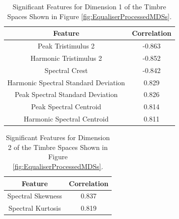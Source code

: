 		\begin{table}[h!]
			\centering
			\begin{tabular}{|c|c|}
				\hline
				\bf{Feature} & \bf{Correlation} \\
				\hline
				\hline
				Peak Tristimulus 2 & -0.863 \\
				\hline
				Harmonic Tristimulus 2 & -0.852 \\
				\hline
				Spectral Crest & -0.842 \\
				\hline
				Harmonic Spectral Standard Deviation &  0.829 \\
				\hline
				Peak Spectral Standard Deviation &  0.826 \\
				\hline
				Peak Spectral Centroid &  0.814 \\
				\hline
				Harmonic Spectral Centroid &  0.811 \\
				\hline
			\end{tabular}
			\caption{Significant Features for Dimension 1 of the Timbre Spaces Shown in Figure 
				 \ref{fig:EqualiserProcessedMDSs}.}
			\label{tab:EqualiserProcessedFeaturesDim1}
		\end{table}

		\begin{table}[h!]
			\centering
			\begin{tabular}{|c|c|}
				\hline
				\bf{Feature} & \bf{Correlation} \\
				\hline
				\hline
				Spectral Skewness & 0.837 \\
				\hline
				Spectral Kurtosis & 0.819 \\
				\hline
			\end{tabular}
			\caption{Significant Features for Dimension 2 of the Timbre Spaces Shown in Figure 
				 \ref{fig:EqualiserProcessedMDSs}.}
			\label{tab:EqualiserProcessedFeaturesDim2}
		\end{table}

